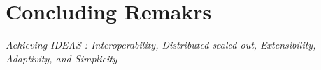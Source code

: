 \documentclass{sig-alternate}
\begin{document}
\section{Concluding Remakrs}

\textit{Achieving IDEAS : Interoperability, Distributed
  scaled-out, Extensibility, Adaptivity, and Simplicity}

  
\end{document}
